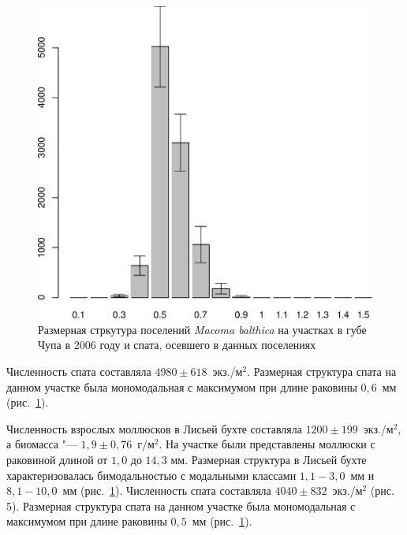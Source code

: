 \begin{figure}[p]
\begin{minipage}[b]{.46\linewidth}
\begin{center}
	\end{center}
	\end{minipage}
%
	\hfil %
%
	\begin{minipage}[b]{.46\linewidth}
	\begin{center}	
		\includegraphics[width=0.21\textheight]{../White_Sea/spat/spat_str_Podpahta_1.pdf}
	\end{center}
	\end{minipage}
		\caption{Размерная стркутура поселений {\it Macoma balthica} на участках в губе Чупа в 2006 году и спата, осевшего в данных поселениях}
		\label{ris:Chupa_spat_sizestr}
	\end{figure}
Численность спата составляла $4980 \pm 618$~экз./м$^2$. 
Размерная структура спата на данном участке была мономодальная с максимумом при длине раковины $0,6$~мм (рис.~\ref{ris:Chupa_spat_sizestr}).

Численность взрослых моллюсков в Лисьей бухте составляла $1200 \pm 199$~экз./м$^2$, а биомасса "--- $1,9 \pm 0,76$~г/м$^2$. 
На участке были представлены моллюски с раковиной длиной от $1,0$ до $14,3$ мм. 
Размерная структура в Лисьей бухте характеризовалась бимодальностью с модальными классами $1,1 - 3,0$~мм и $8,1 - 10,0$~мм (рис.~\ref{ris:Chupa_spat_sizestr}). 
Численность спата составляла $4040 \pm 832$~экз./м$^2$ (рис. 5). 
Размерная структура спата на данном участке была мономодальная с максимумом при длине раковины $0,5$~мм (рис.~\ref{ris:Chupa_spat_sizestr}).

